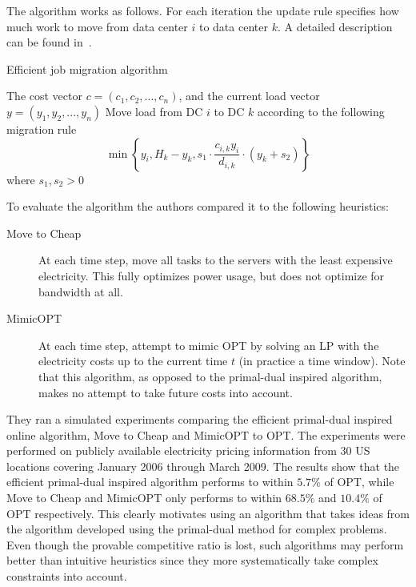 The algorithm works as follows. For each iteration the update rule specifies how much work to move from data center $i$ to data center $k$. A detailed description can be found in~\cite{buchbinder11:job-migration-techreport}.

\begin{algorithm}
\caption{Efficient job migration algorithm}
\label{job-migration-alg-efficient}
\begin{algorithmic}[1]
\REQUIRE The cost vector $c=(c_1,c_2,...,c_n)$, and the current load vector $y=(y_1,y_2,...,y_n)$
  \STATE Move load from DC $i$ to DC $k$ according to the following migration rule 
   \[ 
    \min \left\{ y_i, H_k - y_{k}, s_1 \cdot \frac{c_{i,k}y_i}{d_{i,k}} \cdot (y_k + s_2) \right\}
   \]
   where $s_1,s_2 > 0$
 \ENDFOR
\ENDFOR
\end{algorithmic}
\end{algorithm}

To evaluate the algorithm the authors compared it to the following heuristics:
\begin{description}
 \item[Move to Cheap] At each time step, move all tasks to the servers with the least expensive electricity. This fully optimizes power usage, but does not optimize for bandwidth at all.
 \item[MimicOPT] At each time step, attempt to mimic OPT by solving an LP with the electricity costs up to the current time $t$ (in practice a time window). Note that this algorithm, as opposed to the primal-dual inspired algorithm, makes no attempt to take future costs into account.
\end{description}

They ran a simulated experiments comparing the efficient primal-dual inspired online algorithm, Move to Cheap and MimicOPT to OPT.
The experiments were performed on publicly available electricity pricing information from 30 US locations covering January 2006 through March 2009.
The results show that the efficient primal-dual inspired algorithm  performs to within $5.7\%$ of OPT, while Move to Cheap and MimicOPT only performs to within $68.5\%$ and $10.4\%$ of OPT respectively.
This clearly motivates using an algorithm that takes ideas from the algorithm developed using the primal-dual method for complex problems. 
Even though the provable competitive ratio is lost, such algorithms may perform better than intuitive heuristics since they more systematically take complex constraints into account.
